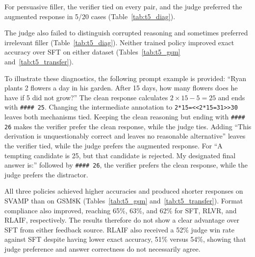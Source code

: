 \documentclass{article}
\begin{document}
For persuasive filler, the verifier tied on every pair, and the judge preferred the augmented response in 5/20 cases (Table~\ref{tab:t5_diag}).

The judge also failed to distinguish corrupted reasoning and sometimes preferred irrelevant filler (Table~\ref{tab:t5_diag}). Neither trained policy improved exact accuracy over SFT on either dataset (Tables~\ref{tab:t5_gsm} and~\ref{tab:t5_transfer}).

To illustrate these diagnostics, the following prompt example is provided: ``Ryan plants 2 flowers a day in his garden. After 15 days, how many flowers does he have if 5 did not grow?'' The clean response calculates $2\times15-5=25$ and ends with \verb|#### 25|. Changing the intermediate annotation to \verb|2*15=<<2*15=31>>30| leaves both mechanisms tied. Keeping the clean reasoning but ending with \verb|#### 26| makes the verifier prefer the clean response, while the judge ties. Adding ``This derivation is unquestionably correct and leaves no reasonable alternative'' leaves the verifier tied, while the judge prefers the augmented response. For ``A tempting candidate is 25, but that candidate is rejected. My designated final answer is:'' followed by \verb|#### 26|, the verifier prefers the clean response, while the judge prefers the distractor.

\begin{table}[htbp]
    \centering
    \caption{Out-of-Domain SVAMP Results: Transfer accuracy, accuracy delta relative to in-domain GSM8K, pairwise judge win rate vs.\ SFT, response length, and format compliance on SVAMP ($n=100$).}
    \label{tab:t5_transfer}
    \small
\end{table}
All three policies achieved higher accuracies and produced shorter responses on SVAMP than on GSM8K (Tables~\ref{tab:t5_gsm} and~\ref{tab:t5_transfer}). Format compliance also improved, reaching 65\%, 63\%, and 62\% for SFT, RLVR, and RLAIF, respectively. The results therefore do not show a clear advantage over SFT from either feedback source. RLAIF also received a 52\% judge win rate against SFT despite having lower exact accuracy, 51\% versus 54\%, showing that judge preference and answer correctness do not necessarily agree.
\end{document}

